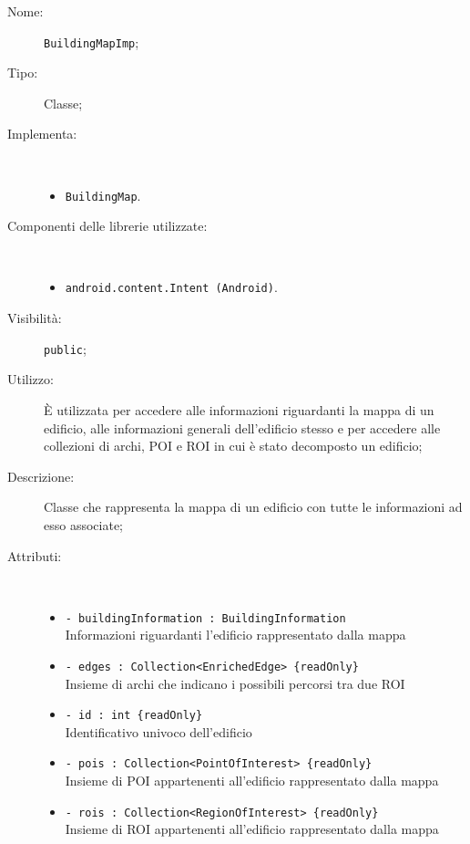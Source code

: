 \documentclass[../DefinizioneDiProdotto.tex]{subfiles}
\begin{document}
\begin{description}
	\item[Nome:] \texttt{BuildingMapImp};
	\item[Tipo:] Classe;
	\item[Implementa:] \
	\begin{itemize}
		\item \texttt{BuildingMap}.
		
	\end{itemize}
	\item[Componenti delle librerie utilizzate:] \
	\begin{itemize}
		\item \texttt{android.content.Intent (Android)}.
		
	\end{itemize}
	\item[Visibilità:] \texttt{public};
	\item[Utilizzo:] È utilizzata per accedere alle informazioni riguardanti la mappa di un edificio, alle informazioni generali dell'edificio stesso e per accedere alle collezioni di archi, POI e ROI in cui è stato decomposto un edificio;
	\item[Descrizione:] Classe che rappresenta la mappa di un edificio con tutte le informazioni ad esso associate;
	\item[Attributi:] \
	\begin{itemize}
		\item \texttt{- buildingInformation : BuildingInformation}\\
		Informazioni riguardanti l'edificio rappresentato dalla mappa
		
		\item \texttt{- edges : Collection<EnrichedEdge> \{readOnly\}}\\
		Insieme di archi che indicano i possibili percorsi tra due ROI
		
		\item \texttt{- id : int \{readOnly\}}\\
		Identificativo univoco dell'edificio
		
		\item \texttt{- pois : Collection<PointOfInterest> \{readOnly\}}\\
		Insieme di POI appartenenti all'edificio rappresentato dalla mappa
		
		\item \texttt{- rois : Collection<RegionOfInterest> \{readOnly\}}\\
		Insieme di ROI appartenenti all'edificio rappresentato dalla mappa
		

\end{itemize}
\end{description}
\end{document}
